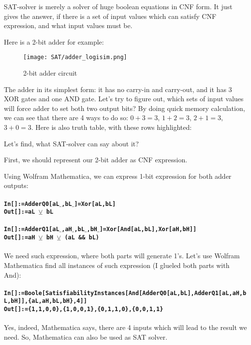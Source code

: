\ac{SAT}-solver is merely a solver of huge boolean equations in CNF form.
It just gives the answer, if there is a set of input values which can satisfy CNF expression, and what input values must be.

Here is a 2-bit adder for example:

\begin{figure}[ht!]
\centering
\texttt{[image: SAT/adder\_logisim.png]}
\caption{2-bit adder circuit}
\end{figure}

The adder in its simplest form: it has no carry-in and carry-out, and it has 3 XOR gates and one AND gate.
Let's try to figure out, which sets of input values will force adder to set both two output bits?
By doing quick memory calculation, we can see that there are 4 ways to do so: $0+3=3$, $1+2=3$, $2+1=3$, $3+0=3$.
Here is also truth table, with these rows highlighted:



Let's find, what \ac{SAT}-solver can say about it?

First, we should represent our 2-bit adder as \ac{CNF} expression.

Using Wolfram Mathematica, we can express 1-bit expression for both adder outputs:\\
\\
\textbf{\texttt{In[]:=AdderQ0[aL$\_$,bL$\_$]=Xor[aL,bL]}} \\
\textbf{\texttt{Out[]:=aL $\veebar$ bL}} \\
\\
\textbf{\texttt{In[]:=AdderQ1[aL$\_$,aH$\_$,bL$\_$,bH$\_$]=Xor[And[aL,bL],Xor[aH,bH]]}} \\
\textbf{\texttt{Out[]:=aH $\veebar$ bH $\veebar$ (aL \&\& bL)}} \\
\\
We need such expression, where both parts will generate 1's.
Let's use Wolfram Mathematica find all instances of such expression (I glueled both parts with And): \\
\\
\textbf{\texttt{In[]:=Boole[SatisfiabilityInstances[And[AdderQ0[aL,bL],AdderQ1[aL,aH,bL,bH]],\{aL,aH,bL,bH\},4]]}} \\
\textbf{\texttt{Out[]:=\{1,1,0,0\},\{1,0,0,1\},\{0,1,1,0\},\{0,0,1,1\}}} \\
\\
Yes, indeed, Mathematica says, there are 4 inputs which will lead to the result we need.
So, Mathematica can also be used as \ac{SAT} solver.

